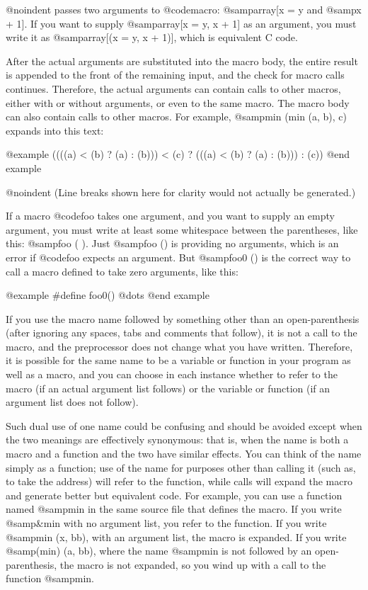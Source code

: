 {@noindent
passes two arguments to @code{macro}: @samp{array[x = y} and @samp{x +
1]}.  If you want to supply @samp{array[x = y, x + 1]} as an argument,
you must write it as @samp{array[(x = y, x + 1)]}, which is equivalent C
code.

After the actual arguments are substituted into the macro body, the entire
result is appended to the front of the remaining input, and the check for
macro calls continues.  Therefore, the actual arguments can contain calls
to other macros, either with or without arguments, or even to the same
macro.  The macro body can also contain calls to other macros.  For
example, @samp{min (min (a, b), c)} expands into this text:

@example
((((a) < (b) ? (a) : (b))) < (c)
 ? (((a) < (b) ? (a) : (b)))
 : (c))
@end example

@noindent
(Line breaks shown here for clarity would not actually be generated.)

If a macro @code{foo} takes one argument, and you want to supply an
empty argument, you must write at least some whitespace between the
parentheses, like this: @samp{foo ( )}.  Just @samp{foo ()} is providing
no arguments, which is an error if @code{foo} expects an argument.  But
@samp{foo0 ()} is the correct way to call a macro defined to take zero
arguments, like this:

@example
#define foo0() @dots{}
@end example

If you use the macro name followed by something other than an
open-parenthesis (after ignoring any spaces, tabs and comments that
follow), it is not a call to the macro, and the preprocessor does not
change what you have written.  Therefore, it is possible for the same name
to be a variable or function in your program as well as a macro, and you
can choose in each instance whether to refer to the macro (if an actual
argument list follows) or the variable or function (if an argument list
does not follow).

Such dual use of one name could be confusing and should be avoided
except when the two meanings are effectively synonymous: that is, when the
name is both a macro and a function and the two have similar effects.  You
can think of the name simply as a function; use of the name for purposes
other than calling it (such as, to take the address) will refer to the
function, while calls will expand the macro and generate better but
equivalent code.  For example, you can use a function named @samp{min} in
the same source file that defines the macro.  If you write @samp{&min} with
no argument list, you refer to the function.  If you write @samp{min (x,
bb)}, with an argument list, the macro is expanded.  If you write
@samp{(min) (a, bb)}, where the name @samp{min} is not followed by an
open-parenthesis, the macro is not expanded, so you wind up with a call to
the function @samp{min}.

}
